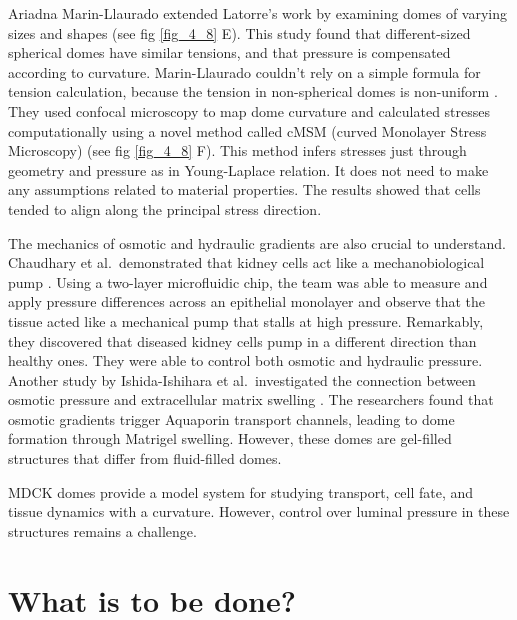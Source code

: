 Ariadna Marin-Llaurado extended Latorre's work by examining domes of varying sizes and shapes (see fig \ref{fig_4_8} E). This study found that different-sized spherical domes have similar tensions, and that pressure is compensated according to curvature. Marin-Llaurado couldn't rely on a simple formula for tension calculation, because the tension in non-spherical domes is non-uniform \cite{marin-llaurado2022}. They used confocal microscopy to map dome curvature and calculated stresses computationally using a novel method called cMSM (curved Monolayer Stress Microscopy) (see fig \ref{fig_4_8} F). This method infers stresses just through geometry and pressure as in Young-Laplace relation. It does not need to make any assumptions related to material properties. The results showed that cells tended to align along the principal stress direction.

The mechanics of osmotic and hydraulic gradients are also crucial to understand. Chaudhary et al.~demonstrated that kidney cells act like a mechanobiological pump \cite{choudhury2022}. Using a two-layer microfluidic chip, the team was able to measure and apply pressure differences across an epithelial monolayer and observe that the tissue acted like a mechanical pump that stalls at high pressure. Remarkably, they discovered that diseased kidney cells pump in a different direction than healthy ones. They were able to control both osmotic and hydraulic pressure. Another study by Ishida-Ishihara et al.~investigated the connection between osmotic pressure and extracellular matrix swelling \cite{ishida-ishihara2020}. The researchers found that osmotic gradients trigger Aquaporin transport channels, leading to dome formation through Matrigel swelling. However, these domes are gel-filled structures that  differ from fluid-filled domes.

MDCK domes provide a model system for studying transport, cell fate, and tissue dynamics with a curvature. However, control over luminal pressure in these structures remains a challenge.

\hypertarget{what-is-to-be-done}{%
	\section{What is to be done?}\label{what-is-to-be-done}}

